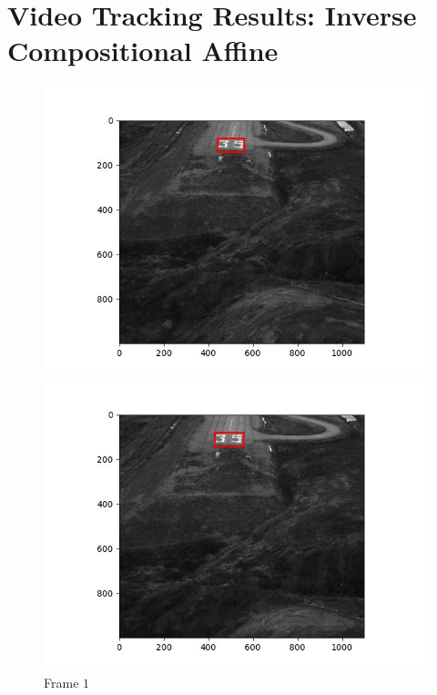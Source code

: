 \section{Video Tracking Results: Inverse Compositional Affine}


\begin{figure}[H]
  \centering
  \begin{minipage}{.49\textwidth}
    \centering
    \includegraphics[width=\textwidth]{./figures/ic_affine/landing/frame000001.jpg}
    \caption{Frame $1$}
  \end{minipage}
  \hfill
  \begin{minipage}{.49\textwidth}
    \centering
    \includegraphics[width=\textwidth]{./figures/ic_affine/landing/frame000010.jpg}

\end{minipage}
\end{figure}
